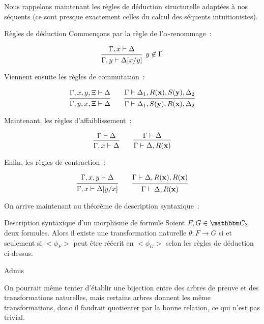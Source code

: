 Nous rappelons maintenant les règles de déduction structurelle adaptées à nos séquents
(ce sont presque exactement celles du calcul des séquents intuitionistes).

\begin{defi}{Règles de déduction}
    Commençons par la règle de l'$\alpha$-renommage~:

    \[ \tproof{ \hypo{\Gamma, x\vdash \Delta}
         \infer1[$y\not\in\Gamma$]{\Gamma, y\vdash \Delta[x/y]} }\]

    Viennent ensuite les règles de commutation~:

    \[ \tproof{ \hypo{\Gamma, x, y, \Xi\vdash \Delta}
         \infer1{\Gamma, y, x, \Xi\vdash \Delta} }
       \qquad
       \tproof{ \hypo{\Gamma\vdash \Delta_1, R(\mathbf{x}), S(\mathbf{y}), \Delta_2}
         \infer1{\Gamma\vdash \Delta_1, S(\mathbf{y}), R(\mathbf{x}), \Delta_2} }
    \]

    Maintenant, les règles d'affaiblissement~:

    \[ \tproof{ \hypo{\Gamma\vdash\Delta}
         \infer1{\Gamma, x\vdash \Delta} }
       \qquad
       \tproof{ \hypo{\Gamma\vdash\Delta}
         \infer1{\Gamma\vdash\Delta,R(\mathbf{x})} }\]

    Enfin, les règles de contraction~:

    \[ \tproof{ \hypo{\Gamma,x,y\vdash\Delta}
         \infer1{\Gamma, x\vdash\Delta[y/x]} }
       \qquad
       \tproof{ \hypo{\Gamma\vdash\Delta, R(\mathbf{x}), R(\mathbf{x})}
         \infer1{\Gamma\vdash\Delta, R(\mathbf{x})} }\]

\end{defi}

On arrive maintenant au théorème de description syntaxique~:

\begin{theo}{Description syntaxique d'un morphisme de formule}
    Soient $F,G\in\C_\Sigma$ deux formules. Alors il existe une transformation
    naturelle $\theta:F\rightarrow G$ si et seulement si $<\phi_F>$ peut être réécrit
    en $<\phi_G>$ selon les règles de déduction ci-dessus.
\end{theo}

\begin{pv}
    Admis
\end{pv}

\begin{rem}
    On pourrait même tenter d'établir une bijection entre des arbres de preuve
    et des transformations naturelles, mais certains arbres donnent les même
    transformations, donc il faudrait quotienter par la bonne relation, ce qui
    n'est pas trivial.
\end{rem}

